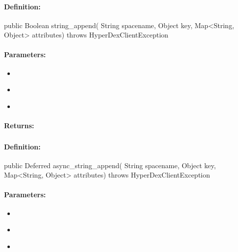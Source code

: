 \paragraph{Definition:}
\begin{javacode}
public Boolean string_append(
        String spacename,
        Object key,
        Map<String, Object> attributes) throws HyperDexClientException
\end{javacode}

\paragraph{Parameters:}
\begin{itemize}[noitemsep]
\item {}\\

\item {}\\

\item {}\\

\end{itemize}

\paragraph{Returns:}


\pagebreak
\subsubsection{}
\label{api:java:async_string_append}


\paragraph{Definition:}
\begin{javacode}
public Deferred async_string_append(
        String spacename,
        Object key,
        Map<String, Object> attributes) throws HyperDexClientException
\end{javacode}

\paragraph{Parameters:}
\begin{itemize}[noitemsep]
\item {}\\

\item {}\\

\item {}\\

\end{itemize}

